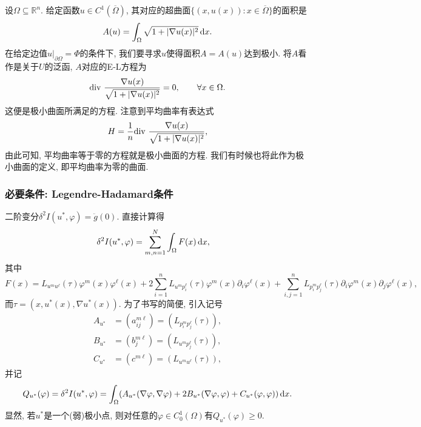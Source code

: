 \begin{example}[极小曲面]
    设$\Omega \subseteq \mathbb{R}^n$. 给定函数$u \in C^1(\overline{\Omega})$, 其对应的超曲面$\{(x, u(x))\colon x \in \overline{\Omega}\}$的面积是
    \begin{equation*}
        A(u) = \int_{\Omega}\sqrt{1 + |\nabla u(x)|^2} \,{\rm d}x.
    \end{equation*}
    在给定边值$u|_{\partial\Omega} = \Phi$的条件下, 我们要寻求$u$使得面积$A = A(u)$达到极小. 将$A$看作是关于$U$的泛函, $A$对应的E-L方程为 
    \begin{equation*}
        {\rm div}\ \frac{\nabla u(x)}{\sqrt{1 + |\nabla u(x)|^2}} = 0, \qquad \forall x \in \Omega.
    \end{equation*}
    这便是极小曲面所满足的方程. 注意到平均曲率有表达式
    \begin{equation*}
        H = \frac{1}{n}{\rm div}\ \frac{\nabla u(x)}{\sqrt{1 + |\nabla u(x)|^2}},
    \end{equation*}
    由此可知, 平均曲率等于零的方程就是极小曲面的方程. 我们有时候也将此作为极小曲面的定义, 即平均曲率为零的曲面.
\end{example}

\subsubsection{必要条件: Legendre-Hadamard条件}

二阶变分$\delta^2I(u^*, \varphi) = \ddot g(0)$. 直接计算得 
\begin{align*}
    \delta^2I(u^*, \varphi) &= \sum_{m, n = 1}^N\int_{\Omega} F(x) \,{\rm d}x,
\end{align*}
其中 
\begin{equation*}
    F(x) = L_{u^mu^\ell}(\tau)\varphi^m(x)\varphi^\ell(x) + 2\sum_{i = 1}^nL_{u^mp^\ell_i}(\tau)\varphi^m(x)\partial_i\varphi^{\ell}(x) + \sum_{i, j = 1}^nL_{p^m_ip^{\ell}_j}(\tau)\partial_i\varphi^m(x)\partial_j\varphi^\ell(x),
\end{equation*}
而$\tau = (x, u^*(x), \nabla u^*(x))$. 为了书写的简便, 引入记号 
\begin{align*}
    A_{u^*} &= (a_{ij}^{m\ell}) = (L_{p^m_ip^{\ell}_j}(\tau)), \\ 
    B_{u^*} &= (b_j^{m\ell}) = (L_{u^mp^\ell_j}(\tau)), \\ 
    C_{u^*} &= (c^{m\ell}) = (L_{u^mu^\ell}(\tau)),
\end{align*}
并记
\begin{equation*}
    Q_{u^*}(\varphi) = \delta^2I(u^*, \varphi) = \int_{\Omega}(A_{u^*}(\nabla\varphi, \nabla\varphi) + 2B_{u^*}(\nabla\varphi, \varphi) + C_{u^*}(\varphi, \varphi)) \,{\rm d}x.
\end{equation*}
显然, 若$u^*$是一个(弱)极小点, 则对任意的$\varphi \in C_0^1(\Omega)$有$Q_{u^*}(\varphi) \geq 0$.

